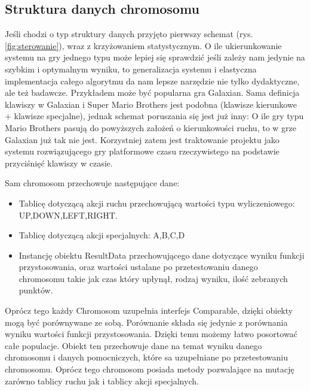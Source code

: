\subsection{Struktura danych chromosomu}
\begin{par}
	Jeśli chodzi o typ struktury danych przyjęto pierwszy schemat (rys.\ref{fig:sterowanie}), wraz z krzyżowaniem statystycznym. 
	O ile ukierunkowanie systemu na gry jednego typu może lepiej się sprawdzić jeśli zależy nam
	jedynie na szybkim i optymalnym wyniku, to generalizacja systemu i elastyczna implementacja całego algorytmu da nam lepsze narzędzie nie tylko dydaktyczne, ale też badawcze.
	Przykładem może być popularna gra Galaxian. Sama definicja klawiszy w Galaxian i Super Mario Brothers jest podobna (klawisze kierunkowe + klawisze specjalne),
	jednak schemat poruszania się jest już inny: O ile gry typu Mario Brothers pasują do powyższych założeń o kierunkowości ruchu, to w grze Galaxian już tak nie jest.
	Korzystniej zatem jest traktowanie projektu jako systemu rozwiązującego gry platformowe czasu rzeczywistego na podstawie przyciśnięć klawiszy w czasie.
\end{par}
\begin{par}
	
	Sam chromosom przechowuje następujące dane:
	\begin{itemize}
		\item Tablicę dotyczącą akcji ruchu przechowującą wartości typu wyliczeniowego: UP,DOWN,LEFT,RIGHT.
		\item Tablicę dotyczącą akcji specjalnych: A,B,C,D
		\item Instancję obiektu ResultData przechowującego dane dotyczące wyniku funkcji przystosowania, oraz wartości ustalane po przetestowaniu danego chromosomu takie jak czas który upłynął, rodzaj wyniku, ilość zebranych punktów.
	\end{itemize}
	Oprócz tego każdy Chromosom uzupełnia interfejs Comparable, dzięki obiekty mogą być porównywane ze sobą. Porównanie składa się jedynie z porównania wyniku wartości funkcji przystosowania. Dzięki temu możemy łatwo posortować całe populacje.
	Obiekt ten przechowuje dane na temat wyniku danego chromosomu i danych pomocniczych, które sa uzupełniane po przetestowaniu chromosomu. Oprócz tego chromosom posiada metody pozwalające na mutację zarówno tablicy ruchu jak i tablicy akcji specjalnych.
\end{par}


